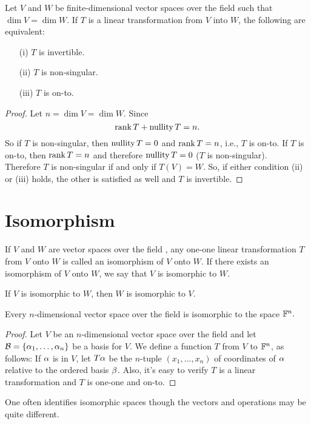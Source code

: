 \documentclass{mynotes}
\begin{document}
\begin{theorem}
Let $V$ and $W$ be finite-dimensional vector spaces over the field \F{} such that $\dim{V}=\dim{W}$. If $T$ is a linear transformation from $V$ into $W$, the following are equivalent:
\begin{itemize}
	\item[(i)]	$T$ is invertible.
	\item[(ii)] $T$ is non-singular.
	\item[(iii)] $T$ is on-to.
\end{itemize}
\end{theorem}
\begin{proof}
Let $n=\dim{V}=\dim{W}.$ Since $$\mathrm{rank}\,{T}+\mathrm{nullity}\,{T} = n.$$So if $T$ is non-singular, then $\mathrm{nullity}\,{T} = 0$ and $\mathrm{rank}\,{T}= n$, i.e., $T$ is on-to.
If $T$ is on-to, then $\mathrm{rank}\,{T} = n$ and therefore $\mathrm{nullity}\,{T} = 0$ ($T$ is non-singular). \\Therefore $T$ is non-singular if and only if $T(V)=W.$ So, if either condition (ii) or (iii) holds, the other is satisfied as well and $T$ is invertible.
\end{proof}
\section{Isomorphism}
\begin{definition}[isomorphism]
If $V$ and $W$ are vector spaces over the field \F, any one-one linear transformation $T$ from $V$ onto $W$ is called an isomorphism of $V$ onto $W$. If there exists an isomorphism of $V$ onto $W$, we say that $V$ is isomorphic to $W$.
\end{definition}
\begin{remark}
If $V$ is isomorphic to $W$, then $W$ is isomorphic to $V$.
\end{remark}
\begin{theorem}
Every $n$-dimensional vector space over the field \F is isomorphic to the space $\mathbb{F}^n.$
\end{theorem}
\begin{proof}
Let $V$ be an $n$-dimensional vector space over the field \F{} and let $\mathcal{B}=\{\alpha_1,\ldots,\alpha_n\}$ be a basis for $V$. We define a function $T$ from $V$ to $\mathbb{F}^n$, as follows: If $\alpha$ is in $V$, let $T\alpha$ be the $n$-tuple $(x_1,\ldots,x_n)$ of coordinates of $\alpha$ relative to the ordered basis $\mathcal{\beta}$. Also, it's easy to verify $T$ is a linear transformation and $T$ is one-one and on-to.
\end{proof}
\begin{remark}
One often identifies isomorphic spaces though the vectors and operations may be quite different.
\end{remark}
\end{document}
